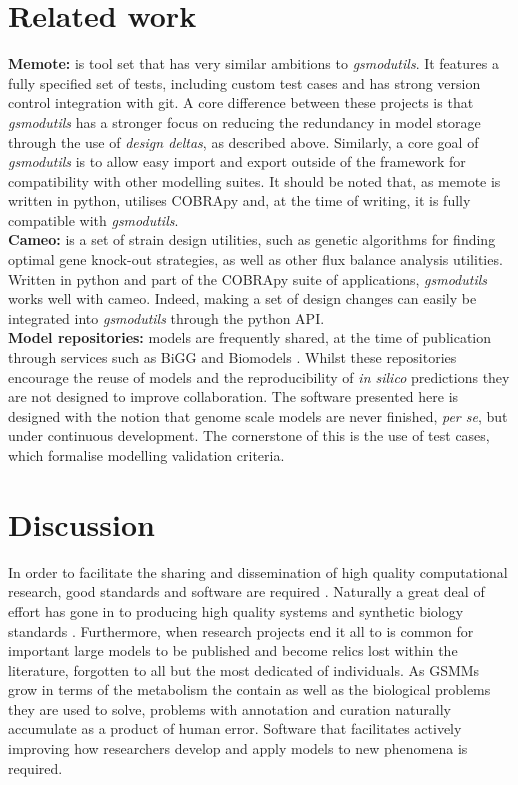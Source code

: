 \documentclass[journal=asbcd6]{achemso}
\begin{document}
\section{Related work}
\textbf{Memote:} \cite{lieven2017memote} is tool set that has very similar ambitions to \textit{gsmodutils}.
It features a fully specified set of tests, including custom test cases and has strong version control integration with git.
A core difference between these projects is that \textit{gsmodutils} has a stronger focus on reducing the redundancy in model storage through the use of \textit{design deltas}, as described above.
Similarly, a core goal of \textit{gsmodutils} is to allow easy import and export outside of the framework for compatibility with other modelling suites.
It should be noted that, as memote is written in python, utilises COBRApy and, at the time of writing, it is fully compatible with \textit{gsmodutils}.
\\
\textbf{Cameo:} \cite{cardoso2017cameo} is a set of strain design utilities, such as genetic algorithms for finding optimal gene knock-out
strategies, as well as other flux balance analysis utilities. Written in python and part of the COBRApy suite of applications, \textit{gsmodutils} works well with cameo.
Indeed, making a set of design changes can easily be integrated into \textit{gsmodutils} through the python API.
\\
\textbf{Model repositories:} models are frequently shared, at the time of publication through services such as BiGG \cite{king2015bigg} and Biomodels \cite{chelliah2013biomodels}. 
Whilst these repositories encourage the reuse of models and the reproducibility of \textit{in silico} predictions they are not designed to improve collaboration.
The software presented here is designed with the notion that genome scale models are never finished, \textit{per se}, but under continuous development.
The cornerstone of this is the use of test cases, which formalise modelling validation criteria.


\section{Discussion}
In order to facilitate the sharing and dissemination of high quality computational research, good standards and software are required \cite{jimenez2017four}.
Naturally a great deal of effort has gone in to producing high quality systems and synthetic biology standards \cite{hucka2003systems, cox2018synthetic}.
Furthermore, when research projects end it all to is common for important large models to be published and become relics lost within the literature, forgotten to all but the most dedicated of individuals.
As GSMMs grow in terms of the metabolism the contain as well as the biological problems they are used to solve, problems with annotation and curation naturally accumulate as a product of human error.
Software that facilitates actively improving how researchers develop and apply models to new phenomena is required.
\end{document}
